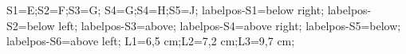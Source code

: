 \documentclass[exercice]{thedocument}%
\begin{document}
%
\>S1=E;\>S2=F;\>S3=G;%
\>S4=G;\>S4=H;\>S5=J;%
\>labelpos-S1=below right;%
\>labelpos-S2=below left;%
\>labelpos-S3=above;%
\>labelpos-S4=above right;%
\>labelpos-S5=below;%
\>labelpos-S6=above left;%
\>L1=6,5 cm;\>L2=7,2 cm;\>L3=9,7 cm;%
%
\end{document}
